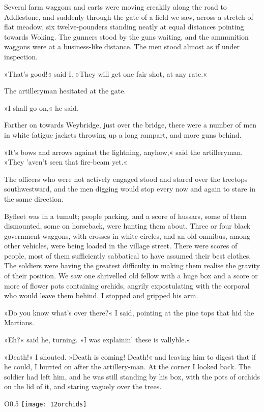 Several farm waggons and carts were moving creakily along the road to Addlestone, and suddenly through the gate of a field we saw, across a stretch of flat meadow, six twelve-pounders standing neatly at equal distances pointing towards Woking. The gunners stood by the guns waiting, and the ammunition waggons were at a business-like distance. The men stood almost as if under inspection.

»That's good!« said I\@. »They will get one fair shot, at any rate.«

The artilleryman hesitated at the gate.

»I shall go on,« he said.

Farther on towards Weybridge, just over the bridge, there were a number of men in white fatigue jackets throwing up a long rampart, and more guns behind.

»It's bows and arrows against the lightning, anyhow,« said the artilleryman. »They 'aven't seen that fire-beam yet.«

The officers who were not actively engaged stood and stared over the treetops southwestward, and the men digging would stop every now and again to stare in the same direction.


Byfleet was in a tumult; people packing, and a score of hussars, some of them dismounted, some on horseback, were hunting them about. Three or four black government waggons, with crosses in white circles, and an old omnibus, among other vehicles, were being loaded in the village street. There were scores of people, most of them sufficiently sabbatical to have assumed their best clothes. The soldiers were having the greatest difficulty in making them realise the gravity of their position. We saw one shrivelled old fellow with a huge box and a score or more of flower pots containing orchids, angrily expostulating with the corporal who would leave them behind. I stopped and gripped his arm.

»Do you know what's over there?« I said, pointing at the pine tops that hid the Martians.

»Eh?« said he, turning. »I was explainin' these is vallyble.«

»Death!« I shouted. »Death is coming! Death!« and leaving him to digest that if he could, I hurried on after the artillery-man. At the corner I looked back. The soldier had left him, and he was still standing by his box, with the pots of orchids on the lid of it, and staring vaguely over the trees.

\begin{wrapfigure}{O}{0.5\textwidth}
\centering
\texttt{[image: 12orchids]}
\end{wrapfigure}

